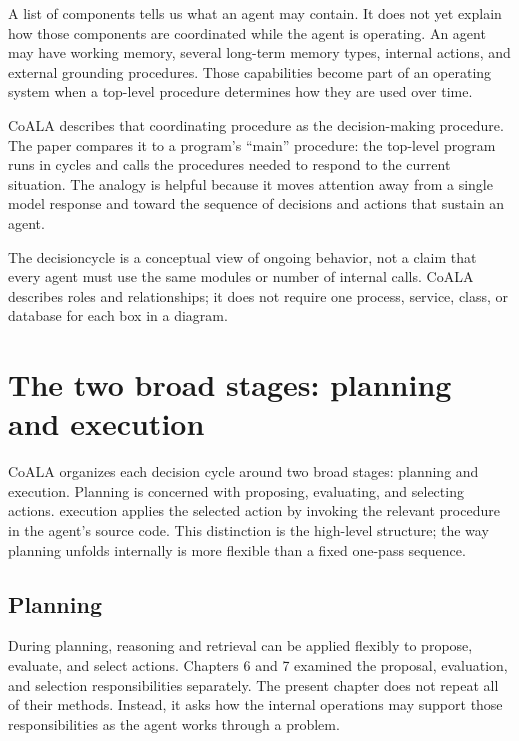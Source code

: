 A list of components tells us what an agent may contain. It does not yet explain how those components are coordinated while the agent is operating. An agent may have working memory, several long-term memory types, internal actions, and external grounding procedures. Those capabilities become part of an operating system when a top-level procedure determines how they are used over time.

CoALA describes that coordinating procedure as the decision-making procedure. The paper compares it to a program's ``main'' procedure: the top-level program runs in cycles and calls the procedures needed to respond to the current situation. The analogy is helpful because it moves attention away from a single model response and toward the sequence of decisions and actions that sustain an agent.

The \gls{decisioncycle} is a conceptual view of ongoing behavior, not a claim that every agent must use the same modules or number of internal calls. CoALA describes roles and relationships; it does not require one process, service, class, or database for each box in a diagram.

\section{The two broad stages: planning and execution}
\label{sec:planning-execution}

CoALA organizes each decision cycle around two broad stages: planning and execution. Planning is concerned with proposing, evaluating, and selecting actions. {\gls{execution}} applies the selected action by invoking the relevant procedure in the agent's source code. This distinction is the high-level structure; the way planning unfolds internally is more flexible than a fixed one-pass sequence.

\subsection{Planning}

During planning, reasoning and retrieval can be applied flexibly to propose, evaluate, and select actions. Chapters 6 and 7 examined the proposal, evaluation, and selection responsibilities separately. The present chapter does not repeat all of their methods. Instead, it asks how the internal operations may support those responsibilities as the agent works through a problem.

